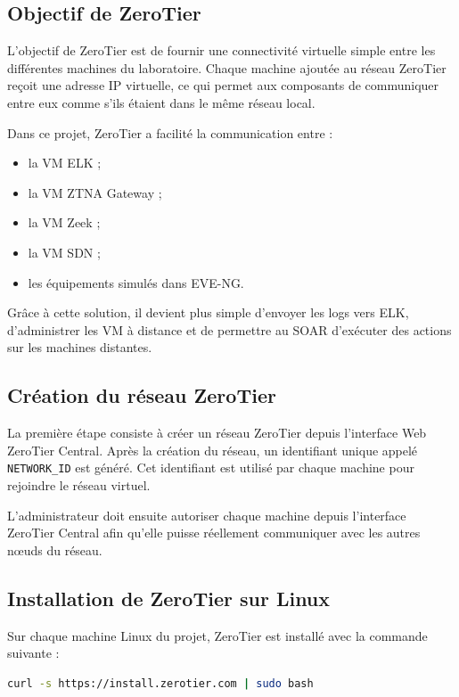 \documentclass[12pt,a4paper,oneside]{report}
\begin{document}
	\subsection{Objectif de ZeroTier}
	
	L'objectif de ZeroTier est de fournir une connectivité virtuelle simple entre les différentes machines du laboratoire. Chaque machine ajoutée au réseau ZeroTier reçoit une adresse IP virtuelle, ce qui permet aux composants de communiquer entre eux comme s'ils étaient dans le même réseau local.
	
	Dans ce projet, ZeroTier a facilité la communication entre :
	
	\begin{itemize}
		\item la VM ELK ;
		\item la VM ZTNA Gateway ;
		\item la VM Zeek ;
		\item la VM SDN ;
		\item les équipements simulés dans EVE-NG.
	\end{itemize}
	
	Grâce à cette solution, il devient plus simple d'envoyer les logs vers ELK, d'administrer les VM à distance et de permettre au SOAR d'exécuter des actions sur les machines distantes.
	
	\subsection{Création du réseau ZeroTier}
	
	La première étape consiste à créer un réseau ZeroTier depuis l'interface Web ZeroTier Central. Après la création du réseau, un identifiant unique appelé \texttt{NETWORK\_ID} est généré. Cet identifiant est utilisé par chaque machine pour rejoindre le réseau virtuel.
	
	L'administrateur doit ensuite autoriser chaque machine depuis l'interface ZeroTier Central afin qu'elle puisse réellement communiquer avec les autres nœuds du réseau.
	
	\subsection{Installation de ZeroTier sur Linux}
	
	Sur chaque machine Linux du projet, ZeroTier est installé avec la commande suivante :
	
	\begin{lstlisting}[language=bash]
		curl -s https://install.zerotier.com | sudo bash
	\end{lstlisting}
	
\end{document}

